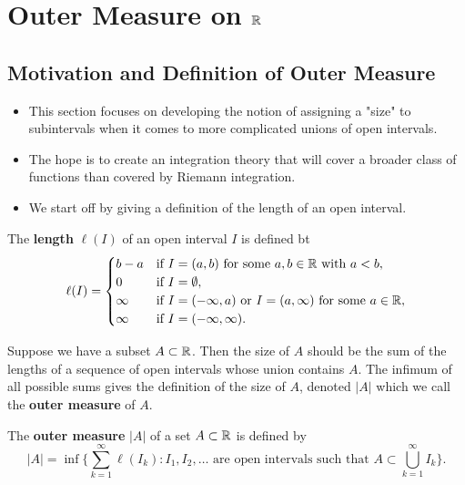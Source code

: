 \documentclass[11pt,a4paper]{book}
\begin{document}
\section{Outer Measure on \( \mathbb{R} \)}

\subsection{Motivation and Definition of Outer Measure}

\begin{itemize}
    \item This section focuses on developing the notion of assigning a "size" to subintervals when it comes to more complicated unions of open intervals.  
    \item The hope is to create an integration theory that will cover a broader class of functions than covered by Riemann integration.
    \item We start off by giving a definition of the length of an open interval. 
\end{itemize}

\begin{definition}
    The \textbf{length} \(\ell(I) \) of an open interval \( I  \) is defined bt  
    \[ \ell(I) = 
    \begin{cases}
        b - a &\text{if } I = (a,b) \text{ for some } a,b \in \mathbb{R} \text{ with } a < b,   \\
        0 &\text{if } I = \emptyset, \\
        \infty &\text{if } I = (- \infty ,a) \text{ or } I = (a, \infty ) \text{ for some } a \in \mathbb{R}, \\
        \infty &\text{if } I = (-\infty, \infty  ).
    \end{cases} \]
\end{definition}

Suppose we have a subset \( A \subset \mathbb{R}  \). Then the size of \( A  \) should be the sum of the lengths of a sequence of open intervals whose union contains \( A  \). The infimum of all possible sums gives the definition of the size of \( A  \), denoted \( | A |  \) which we call the \textbf{outer measure} of \( A  \). 

\begin{definition}
    The \textbf{outer measure} \( | A |  \) of a set \( A \subset \mathbb{R}  \) is defined by
    \[  | A |  = \inf \Big\{ \sum_{ k=1  }^{ \infty  } \ell({I}_{k}) : {I}_{1}, {I}_{2}, \dots \text{ are open intervals such that } A \subset \bigcup_{ k=1 }^{ \infty  } {I}_{k}  \Big\}.  \]
\end{definition}
\end{document}
